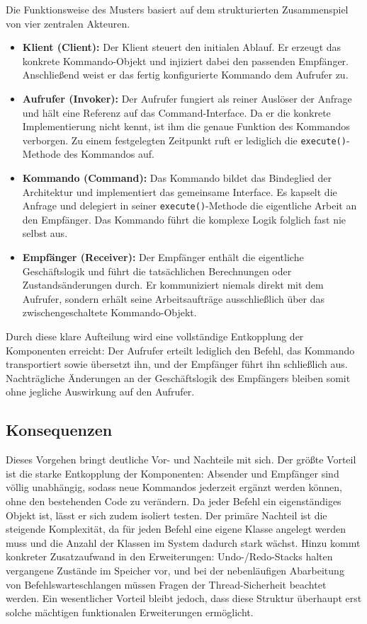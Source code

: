 \documentclass[12pt,a4paper]{article}
\begin{document}
    Die Funktionsweise des Musters basiert auf dem strukturierten Zusammenspiel von vier zentralen Akteuren.

    \begin{itemize}
        \item \textbf{Klient (Client):} Der Klient steuert den initialen Ablauf. Er erzeugt das konkrete Kommando-Objekt
        und injiziert dabei den passenden Empfänger. Anschließend weist er das fertig konfigurierte Kommando dem Aufrufer zu.
        \item \textbf{Aufrufer (Invoker):} Der Aufrufer fungiert als reiner Auslöser der Anfrage und hält eine Referenz auf
        das Command-Interface. Da er die konkrete Implementierung nicht kennt, ist ihm die genaue Funktion des Kommandos verborgen.
        Zu einem festgelegten Zeitpunkt ruft er lediglich die \texttt{execute()}-Methode des Kommandos auf.
        \item \textbf{Kommando (Command):} Das Kommando bildet das Bindeglied der Architektur und implementiert das gemeinsame
        Interface. Es kapselt die Anfrage und delegiert in seiner \texttt{execute()}-Methode die eigentliche Arbeit an den Empfänger.
        Das Kommando führt die komplexe Logik folglich fast nie selbst aus.
        \item \textbf{Empfänger (Receiver):} Der Empfänger enthält die eigentliche Geschäftslogik und führt die tatsächlichen Berechnungen
        oder Zustandsänderungen durch. Er kommuniziert niemals direkt mit dem Aufrufer, sondern erhält seine Arbeitsaufträge ausschließlich über das zwischengeschaltete Kommando-Objekt.
    \end{itemize}

    Durch diese klare Aufteilung wird eine vollständige Entkopplung der Komponenten erreicht: Der Aufrufer erteilt lediglich den Befehl, das Kommando transportiert sowie übersetzt ihn, und der Empfänger führt ihn schließlich aus. Nachträgliche Änderungen an der Geschäftslogik des Empfängers bleiben somit ohne jegliche Auswirkung auf den Aufrufer.

    \subsection{Konsequenzen}
    Dieses Vorgehen bringt deutliche Vor- und Nachteile mit sich. Der größte Vorteil ist die starke
    Entkopplung der Komponenten: Absender und Empfänger sind völlig unabhängig, sodass neue Kommandos jederzeit ergänzt werden können,
    ohne den bestehenden Code zu verändern. Da jeder Befehl ein eigenständiges Objekt ist, lässt er sich zudem isoliert testen. Der
    primäre Nachteil ist die steigende Komplexität, da für jeden Befehl eine eigene Klasse angelegt werden muss und die Anzahl der
    Klassen im System dadurch stark wächst. Hinzu kommt konkreter Zusatzaufwand in den Erweiterungen: Undo-/Redo-Stacks halten
    vergangene Zustände im Speicher vor, und bei der nebenläufigen Abarbeitung von Befehlswarteschlangen müssen Fragen der
    Thread-Sicherheit beachtet werden. Ein wesentlicher Vorteil bleibt jedoch, dass diese Struktur überhaupt erst solche mächtigen
    funktionalen Erweiterungen ermöglicht.
\end{document}
